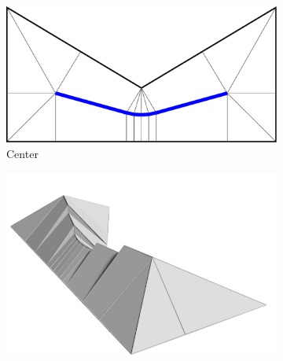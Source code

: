 \begin{figure}
\begin{subfigure}{\figwidth}
\includegraphics[width=\figwidthTwo]{sources/method/surface/marked.pdf}
\caption{Center}\label{3d_surface_overview_center}
\end{subfigure}
\begin{subfigure}{\figwidth}\centering
\hspace*{\tempheightTwo}
\includegraphics[width=\figwidthTree]{sources/method/surface/rounded_cropped.png}

\vspace{\tempheight}


\end{subfigure}
\end{figure}
